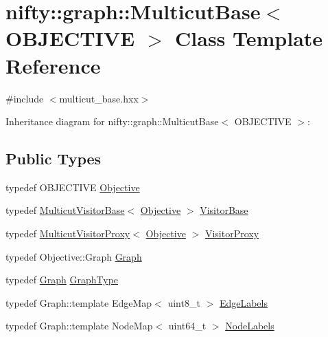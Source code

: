 \hypertarget{classnifty_1_1graph_1_1MulticutBase}{}\section{nifty\+:\+:graph\+:\+:Multicut\+Base$<$ O\+B\+J\+E\+C\+T\+I\+V\+E $>$ Class Template Reference}
\label{classnifty_1_1graph_1_1MulticutBase}


{\ttfamily \#include $<$multicut\+\_\+base.\+hxx$>$}



Inheritance diagram for nifty\+:\+:graph\+:\+:Multicut\+Base$<$ O\+B\+J\+E\+C\+T\+I\+V\+E $>$\+:
\subsection*{Public Types}
\begin{DoxyCompactItemize}
\item 
typedef O\+B\+J\+E\+C\+T\+I\+V\+E \hyperlink{classnifty_1_1graph_1_1MulticutBase_a7d014a4aa2d6e8fa3cd58b70b95ca829}{Objective}
\item 
typedef \hyperlink{namespacenifty_1_1graph_a33375e819f3dda82c6458bdc3cfbe81a}{Multicut\+Visitor\+Base}$<$ \hyperlink{classnifty_1_1graph_1_1MulticutBase_a7d014a4aa2d6e8fa3cd58b70b95ca829}{Objective} $>$ \hyperlink{classnifty_1_1graph_1_1MulticutBase_a5882fb69df59d8113f6a81a0dac26eaa}{Visitor\+Base}
\item 
typedef \hyperlink{namespacenifty_1_1graph_a53f439b765cf049a489391b5a4dd7c36}{Multicut\+Visitor\+Proxy}$<$ \hyperlink{classnifty_1_1graph_1_1MulticutBase_a7d014a4aa2d6e8fa3cd58b70b95ca829}{Objective} $>$ \hyperlink{classnifty_1_1graph_1_1MulticutBase_a6ede271a3cb0ae4711a7e9da2b07efa9}{Visitor\+Proxy}
\item 
typedef Objective\+::\+Graph \hyperlink{classnifty_1_1graph_1_1MulticutBase_aed98150a2206d8355fa06f9bda580fdc}{Graph}
\item 
typedef \hyperlink{classnifty_1_1graph_1_1MulticutBase_aed98150a2206d8355fa06f9bda580fdc}{Graph} \hyperlink{classnifty_1_1graph_1_1MulticutBase_a0c674562b9f64182f2724057102241ab}{Graph\+Type}
\item 
typedef Graph\+::template Edge\+Map$<$ uint8\+\_\+t $>$ \hyperlink{classnifty_1_1graph_1_1MulticutBase_aaeefe3c5df81d9c9efffec878cf2fcd7}{Edge\+Labels}
\item 
typedef Graph\+::template Node\+Map$<$ uint64\+\_\+t $>$ \hyperlink{classnifty_1_1graph_1_1MulticutBase_afba61ad2919d0fad20b3745af19309da}{Node\+Labels}
\end{DoxyCompactItemize}
